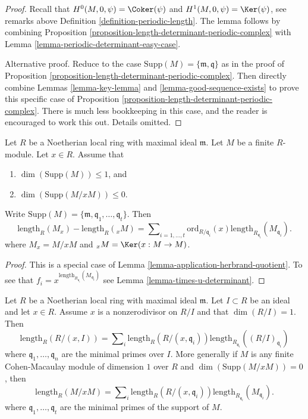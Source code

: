 \begin{proof}
Recall that $H^0(M, 0, \psi) = \Coker(\psi)$ and
$H^1(M, 0, \psi) = \Ker(\psi)$, see remarks above
Definition \ref{definition-periodic-length}.
The lemma follows by combining
Proposition \ref{proposition-length-determinant-periodic-complex} with
Lemma \ref{lemma-periodic-determinant-easy-case}.

\medskip\noindent
Alternative proof. Reduce to the case
$\text{Supp}(M) = \{\mathfrak m, \mathfrak q\}$
as in the proof of
Proposition \ref{proposition-length-determinant-periodic-complex}.
Then directly combine
Lemmas \ref{lemma-key-lemma} and
\ref{lemma-good-sequence-exists}
to prove this specific case of
Proposition \ref{proposition-length-determinant-periodic-complex}.
There is much less bookkeeping in this case, and the reader is
encouraged to work this out. Details omitted.
\end{proof}

\begin{lemma}
\label{lemma-length-multiplication}
Let $R$ be a Noetherian local ring with maximal ideal $\mathfrak m$.
Let $M$ be a finite $R$-module.
Let $x \in R$.
Assume that
\begin{enumerate}
\item $\dim(\text{Supp}(M)) \leq 1$, and
\item $\dim(\text{Supp}(M/xM)) \leq 0$.
\end{enumerate}
Write
$\text{Supp}(M) = \{\mathfrak m, \mathfrak q_1, \ldots, \mathfrak q_t\}$.
Then
$$
\text{length}_R(M_x)
-
\text{length}_R({}_xM)
=
\sum\nolimits_{i = 1, \ldots, t}
\text{ord}_{R/\mathfrak q_i}(x)
\text{length}_{R_{\mathfrak q_i}}(M_{\mathfrak q_i}).
$$
where $M_x = M/xM$ and ${}_xM = \Ker(x : M \to M)$.
\end{lemma}

\begin{proof}
This is a special case of Lemma \ref{lemma-application-herbrand-quotient}.
To see that $f_i = x^{\text{length}_{R_{\mathfrak q_i}}(M_{\mathfrak q_i})}$
see Lemma \ref{lemma-times-u-determinant}.
\end{proof}

\begin{lemma}
\label{lemma-additivity-divisors-restricted}
Let $R$ be a Noetherian local ring with maximal ideal $\mathfrak m$.
Let $I \subset R$ be an ideal and let $x \in R$.
Assume $x$ is a nonzerodivisor on $R/I$ and that $\dim(R/I) = 1$.
Then
$$
\text{length}_R(R/(x, I))
=
\sum\nolimits_i \text{length}_R(R/(x, \mathfrak q_i))
\text{length}_{R_{\mathfrak q_i}}((R/I)_{\mathfrak q_i})
$$
where $\mathfrak q_1, \ldots, \mathfrak q_n$ are the minimal
primes over $I$. More generally if $M$ is any finite Cohen-Macaulay
module of dimension $1$ over $R$ and $\dim(\text{Supp}(M/xM)) = 0$, then
$$
\text{length}_R(M/xM)
=
\sum\nolimits_i \text{length}_R(R/(x, \mathfrak q_i))
\text{length}_{R_{\mathfrak q_i}}(M_{\mathfrak q_i}).
$$
where $\mathfrak q_1, \ldots, \mathfrak q_t$ are the
minimal primes of the support of $M$.
\end{lemma}

